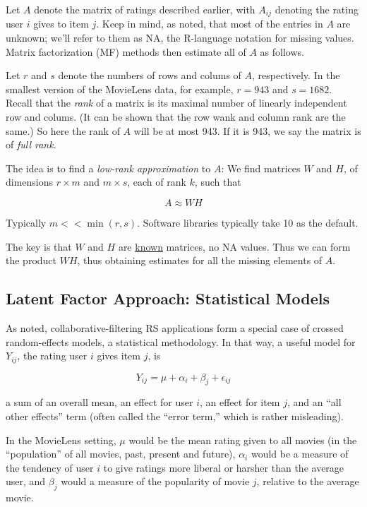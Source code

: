 Let $A$ denote the matrix of ratings described earlier, with $A_{ij}$
denoting the rating user $i$ gives to item $j$.  Keep in mind, as noted,
that most of the entries in $A$ are unknown; we'll refer to them as NA,
the R-language notation for missing values.  Matrix factorization (MF)
methods then estimate all of $A$ as follows.

Let $r$ and $s$ denote the numbers of rows and colums of $A$,
respectively.  In the smallest version of the MovieLens data, for
example, $r = 943$ and $s = 1682$.  Recall that the \textit{rank} of a
matrix is its maximal number of linearly independent row and colums.
(It can be shown that the row wank and column rank are the same.)  So
here the rank of $A$ will be at most 943.  If it is 943, we say the
matrix is of \textit{full rank}.

The idea is to find a \textit{low-rank approximation} to $A$:  We find
matrices $W$ and $H$, of dimensions $r \times m$ and $m \times s$, each
of rank $k$, such that 

\begin{equation}
A \approx WH
\end{equation}

Typically $m << \min(r,s)$.  Software libraries typically take 10 as the
default.

The key is that $W$ and $H$ are \underline{known} matrices, no NA
values.  Thus we can form the product $WH$, thus obtaining estimates for
all the missing elements of $A$.

\subsection{Latent Factor Approach: Statistical Models}

As noted, collaborative-filtering RS applications form a special case of
crossed random-effects models, a statistical methodology.  In that way,
a useful model for $Y_{ij}$, the rating user $i$ gives item $j$, is

\begin{equation}
Y_{ij} = \mu + \alpha_i + \beta_j + \epsilon_{ij}
\end{equation}

a sum of an overall mean, an effect for user $i$, an effect for item
$j$, and an ``all other effects'' term (often called the ``error term,''
which is rather misleading).  

In the MovieLens setting, $\mu$ would be the mean rating given to all
movies (in the ``population'' of all movies, past, present and future),
$\alpha_i$ would be a measure of the tendency of user $i$ to give
ratings more liberal or harsher than the average user, and $\beta_j$
would a measure of the popularity of movie $j$, relative to the average
movie.

